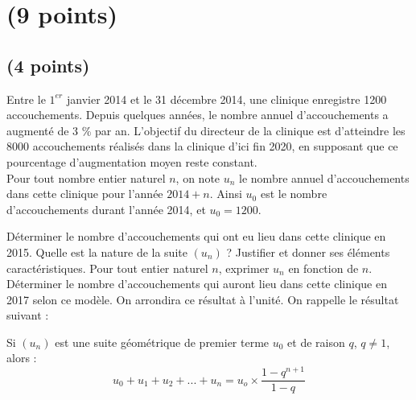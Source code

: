 \section{(9 points)}

\subsection{(4 points)}

Entre le $1^{er}$ janvier 2014 et le 31 décembre 2014, une clinique enregistre \num{1200} accouchements. Depuis quelques années, le nombre annuel d'accouchements a augmenté de 3 \% par an. L'objectif du directeur de la clinique est d'atteindre les \num{8000} accouchements réalisés dans la clinique d'ici fin 2020, en supposant que ce pourcentage d'augmentation moyen reste constant.\\

Pour tout nombre entier naturel $n$, on note $u_n$ le nombre annuel d'accouchements dans cette clinique pour l'année $2014+n$. Ainsi $u_0$ est le nombre d'accouchements durant l'année 2014, et $u_0=\num{1200}$.

\begin{questions}
	\question[\half] Déterminer le nombre d'accouchements  qui ont eu lieu dans cette clinique en 2015.
	\question[1] Quelle est la nature de la suite $(u_n)$ ? Justifier et donner ses éléments caractéristiques.
	\question[1] Pour tout entier naturel $n$, exprimer $u_n$ en fonction de $n$.
	\question[\half] Déterminer le nombre d'accouchements qui auront lieu dans cette clinique en 2017 selon ce modèle. On arrondira ce résultat à l'unité.
	\question[1] On rappelle le résultat suivant :
	
	Si $(u_n)$ est une suite géométrique de premier terme $u_0$ et de raison $q$, $q\neq1$, alors :
	\begin{equation*}
		u_0 + u_1 + u_2 + ... + u_n = u_o \times \dfrac{1-q^{n+1}}{1-q}
	\end{equation*}

\end{questions}

